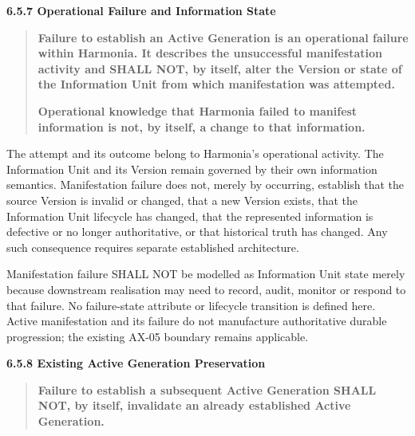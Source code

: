 \par\medskip\textbf{6.5.7 Operational Failure and Information State}\par


\begin{quote}


\textbf{Failure to establish an Active Generation is an operational failure within Harmonia. It describes the unsuccessful manifestation activity and SHALL NOT, by itself, alter the Version or state of the Information Unit from which manifestation was attempted.}



\textbf{Operational knowledge that Harmonia failed to manifest information is not, by itself, a change to that information.}



\end{quote}


The attempt and its outcome belong to Harmonia's operational activity. The
Information Unit and its Version remain governed by their own information
semantics. Manifestation failure does not, merely by occurring, establish that
the source Version is invalid or changed, that a new Version exists, that the
Information Unit lifecycle has changed, that the represented information is
defective or no longer authoritative, or that historical truth has changed.
Any such consequence requires separate established architecture.



Manifestation failure SHALL NOT be modelled as Information Unit state merely
because downstream realisation may need to record, audit, monitor or respond to
that failure. No failure-state attribute or lifecycle transition is defined here.
Active manifestation and its failure do not manufacture authoritative durable
progression; the existing AX-05 boundary remains applicable.



\par\medskip\textbf{6.5.8 Existing Active Generation Preservation}\par


\begin{quote}


\textbf{Failure to establish a subsequent Active Generation SHALL NOT, by itself, invalidate an already established Active Generation.}



\end{quote}


